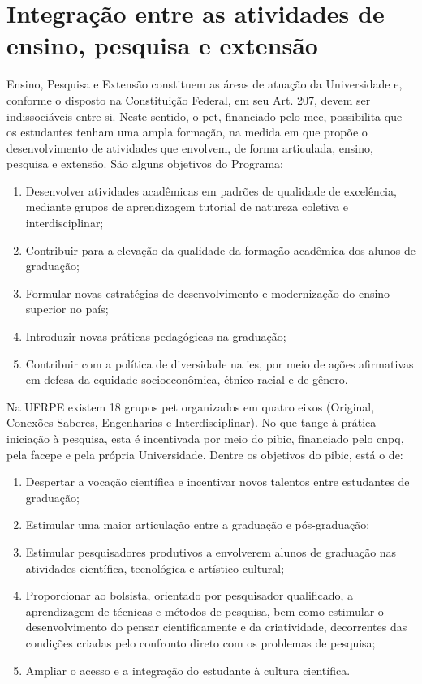 \documentclass[
	12pt,				%
	openright,			%
  oneside,     %
	a4paper,			%
 hyphens,
	chapter=TITLE,		%
	english,			%
	french,				%
	spanish,			%
	brazil				%
	]{abntex2}
\begin{document}
\section{Integração entre as atividades de ensino, pesquisa e extensão}

Ensino, Pesquisa e Extensão constituem as áreas de atuação da Universidade e, conforme o disposto na Constituição Federal, em seu Art. 207, devem ser indissociáveis entre si. Neste sentido, o \acrfull{pet}, financiado pelo \acrshort{mec}, possibilita que os estudantes tenham uma ampla formação, na medida em que propõe o desenvolvimento de atividades que envolvem, de forma articulada, ensino, pesquisa e extensão. São alguns objetivos do Programa:

\begin{enumerate}[label=(\alph*)]
    \item Desenvolver atividades acadêmicas em padrões de qualidade de excelência, mediante grupos de aprendizagem tutorial de natureza coletiva e interdisciplinar;
    \item Contribuir para a elevação da qualidade da formação acadêmica dos alunos de graduação;
    \item Formular novas estratégias de	desenvolvimento e modernização do ensino superior no país;
    \item Introduzir novas práticas pedagógicas na graduação; 
    \item Contribuir com a política de diversidade na \acrshort{ies}, por meio de ações afirmativas em defesa da equidade socioeconômica, étnico-racial e de gênero.
\end{enumerate}

	Na UFRPE existem 18 grupos \acrshort{pet} organizados em quatro eixos (Original, Conexões Saberes, Engenharias e Interdisciplinar). No que tange à prática iniciação à pesquisa, esta é incentivada por meio do \acrfull{pibic}, financiado pelo \acrfull{cnpq}, pela \acrshort{facepe} e pela própria Universidade. Dentre os objetivos do \acrshort{pibic}, está o de:

\begin{enumerate}[label=(\alph*)]
    \item Despertar a vocação científica e incentivar novos talentos entre estudantes de graduação;
    \item Estimular uma maior articulação entre a graduação e pós-graduação;
    \item Estimular pesquisadores produtivos a envolverem alunos de graduação nas atividades científica, tecnológica e artístico-cultural;
    \item Proporcionar ao bolsista, orientado por pesquisador qualificado, a aprendizagem de técnicas e métodos de pesquisa, bem como estimular o desenvolvimento do pensar cientificamente e da criatividade, decorrentes das condições criadas pelo confronto direto com os  problemas de pesquisa;
    \item Ampliar o acesso e a integração do estudante à cultura científica.
\end{enumerate}
\end{document}
